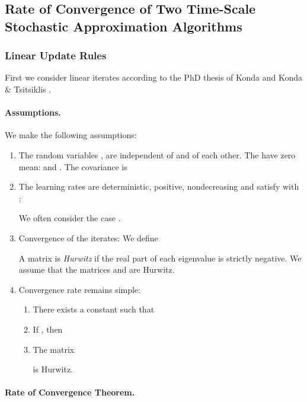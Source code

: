 \documentclass{article}
\begin{document}
\subsection{Rate of Convergence of Two Time-Scale Stochastic  Approximation
Algorithms}
\label{sec:convergenceRate}


\subsubsection{Linear Update Rules}
\label{sec:linur}
First we consider linear iterates according to the PhD thesis of Konda
\cite{Konda:02} and Konda \& Tsitsiklis \cite{Konda:04}.


\paragraph{Assumptions.}
We make the following assumptions:
\begin{enumerate}[label=\textbf{(A\arabic*)}]
\item The random variables , are independent of  and of each other.
The have zero mean:  and
. The covariance is


\item The learning rates are deterministic, positive, nondecreasing
  and satisfy with :

We often consider the case .

\item Convergence of the iterates:
We define

A matrix is {\em Hurwitz} if the real part of each eigenvalue is strictly
negative.
We assume that the matrices  and  are Hurwitz.



\item Convergence rate remains simple:

\begin{enumerate}
\item
There exists a constant  such that

\item
If , then

\item
The matrix

is Hurwitz.
\end{enumerate}

\end{enumerate}




\paragraph{Rate of Convergence Theorem.}
\end{document}

